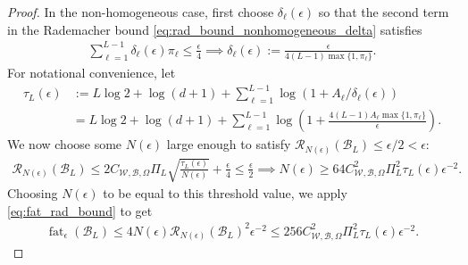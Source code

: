 \documentclass{article}
\DeclareMathOperator{\fat}{\mathrm{fat}}
\def\cB{{\mathcal{B}}}
\def\cR{{\mathcal{R}}}
\def\cW{{\mathcal{W}}}
\begin{document}
\begin{appendices}
\begin{proof}
    In the non-homogeneous case, first choose $\delta_\ell(\epsilon)$ so that the second term in the Rademacher bound \eqref{eq:rad_bound_nonhomogeneous_delta} satisfies
    \begin{align} \label{eq:delta_ell_choice}
        \sum_{\ell=1}^{L-1} \delta_\ell(\epsilon) \pi_\ell \leq \frac{\epsilon}{4} \implies \delta_\ell(\epsilon) := \frac{\epsilon}{4(L-1) \max\{ 1, \pi_\ell\}}.
    \end{align}
    For notational convenience, let
    \begin{align} \label{eq:tau_L_epsilon}
        \tau_L(\epsilon) &:= L \log 2 + \log(d+1) + \sum_{\ell=1}^{L-1} \log (1+ A_\ell/\delta_\ell(\epsilon)) \\
        &= L \log 2 + \log(d+1) + \sum_{\ell=1}^{L-1} \log \left(1+ \frac{4(L-1) A_\ell \max\{ 1, \pi_\ell \}}{\epsilon} \right).
    \end{align}
    We now choose some $N(\epsilon)$ large enough to satisfy $\cR_{N(\epsilon)} (\cB_L) \leq \epsilon/2 < \epsilon$:
    \begin{align}
        \cR_{N(\epsilon)}(\cB_L) \leq 2 C_{\cW, \cB,\Omega} \Pi_L \sqrt{\frac{\tau_L(\epsilon)}{N(\epsilon)}} + \frac{\epsilon}{4} \leq \frac{\epsilon}{2} \implies N(\epsilon) \geq 64 C_{\cW, \cB, \Omega}^2 \Pi_L^2 \tau_L(\epsilon) \epsilon^{-2}.
    \end{align}
    Choosing $N(\epsilon)$ to be equal to this threshold value, we apply \eqref{eq:fat_rad_bound} to get
    \begin{align} \label{eq:fat_rad_bound_nonhomogeneous}
        \fat_\epsilon(\cB_L) \leq 4 N(\epsilon) \cR_{N(\epsilon)}(\cB_L)^2 \epsilon^{-2}  \leq 256 C_{\cW, \cB, \Omega}^2 \Pi_L^2 \tau_L(\epsilon) \epsilon^{-2}. 
    \end{align}

    

\end{proof}
\end{appendices}
\end{document}
